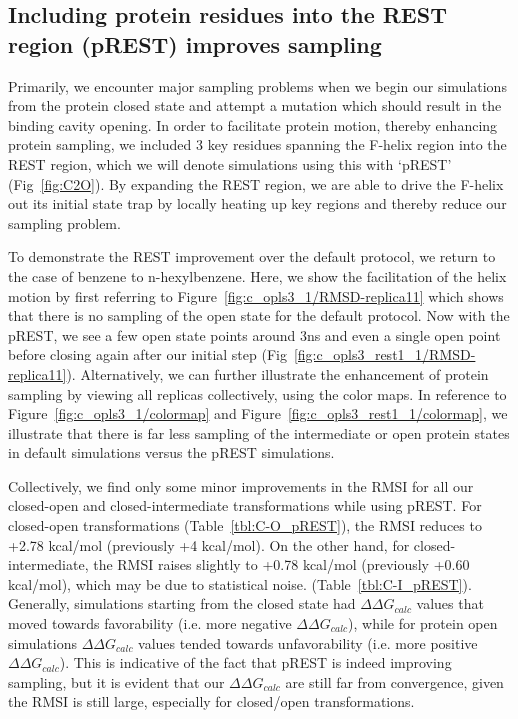 \documentclass[journal=jctcce,manuscript=article]{achemso}
\begin{document}
\subsection*{Including protein residues into the REST region (pREST) improves sampling}
Primarily, we encounter major sampling problems when we begin our simulations from the protein closed state and attempt a mutation which should result in the binding cavity opening.
In order to facilitate protein motion, thereby enhancing protein sampling, we included 3 key residues spanning the F-helix region into the REST region, which we will denote simulations using this with `pREST' (Fig~\ref{fig:C2O}).
By expanding the REST region, we are able to drive the F-helix out its initial state trap by locally heating up key regions and thereby reduce our sampling problem.

To demonstrate the REST improvement over the default protocol, we return to the case of benzene to n-hexylbenzene.
Here, we show the facilitation of the helix motion by first referring to Figure~\ref{fig:c_opls3_1/RMSD-replica11} which shows that there is no sampling of the open state for the default protocol.
Now with the pREST, we see a few open state points around 3ns and even a single open point before closing again after our initial step (Fig~\ref{fig:c_opls3_rest1_1/RMSD-replica11}).
Alternatively, we can further illustrate the enhancement of protein sampling by viewing all replicas collectively, using the color maps.
In reference to Figure~\ref{fig:c_opls3_1/colormap} and Figure~\ref{fig:c_opls3_rest1_1/colormap}, we illustrate that there is far less sampling of the intermediate or open protein states in default simulations versus the pREST simulations.
 
Collectively, we find only some minor improvements in the RMSI for all our closed-open and closed-intermediate transformations while using pREST. 
For closed-open transformations (Table~\ref{tbl:C-O_pREST}), the RMSI reduces to +2.78 kcal/mol (previously +4 kcal/mol). 
On the other hand, for closed-intermediate, the RMSI raises slightly to +0.78 kcal/mol (previously +0.60 kcal/mol), which may be due to statistical noise. (Table~\ref{tbl:C-I_pREST}).
Generally, simulations starting from the closed state had $\Delta\Delta G_{calc}$ values that moved towards favorability (i.e. more negative $\Delta\Delta G_{calc}$), while for protein open simulations $\Delta\Delta G_{calc}$ values tended towards unfavorability (i.e. more positive $\Delta\Delta G_{calc}$).
This is indicative of the fact that pREST is indeed improving sampling, but it is evident that our $\Delta\Delta G_{calc}$ are still far from convergence, given the RMSI is still large, especially for closed/open transformations.
\end{document}
